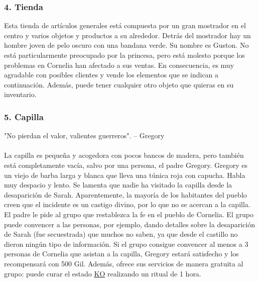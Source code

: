 \subsubsection*{4. Tienda}
Esta tienda de artículos generales está compuesta por un gran mostrador en el centro y varios objetos y productos a su alrededor. Detrás del mostrador hay un hombre joven de pelo oscuro con una bandana verde. Su nombre es Guston. No está particularmente preocupado por la princesa, pero está molesto porque los problemas en Cornelia han afectado a sus ventas. En consecuencia, es muy agradable con posibles clientes y vende los elementos que se indican a continuación. Además, puede tener cualquier otro objeto que quieras en su inventario.
%
\vspace{0.1cm}
%

\subsubsection*{5. Capilla}
"No pierdan el valor, valientes guerreros".
\indent -- Gregory\\\\
La capilla es pequeña y acogedora con pocos bancos de madera, pero también está completamente vacía, salvo por una persona, el padre Gregory. Gregory es un viejo de barba larga y blanca que lleva una túnica roja con capucha. Habla muy despacio y lento. Se lamenta que nadie ha visitado la capilla desde la desaparición de Sarah. Aparentemente, la mayoría de los habitantes del pueblo creen que el incidente es un castigo divino, por lo que no se acercan a la capilla. El padre le pide al grupo que restablezca la fe en el pueblo de Cornelia. El grupo puede convencer a las personas, por ejemplo, dando detalles sobre la desaparición de Sarah (fue secuestrada) que muchos no saben, ya que desde el castillo no dieron ningún tipo de información. Si el grupo consigue convencer al menos a 3 personas de Cornelia que asistan a la capilla, Gregory estará satisfecho y los recompensará con 500 Gil. Además, ofrece sus servicios de manera gratuita al grupo: puede curar el estado \hyperlink{status}{KO} realizando un ritual de 1 hora.

